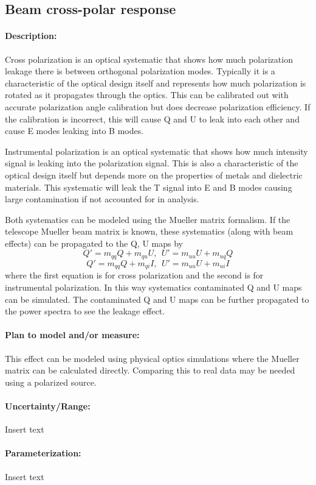 \subsection{Beam cross-polar response}

\paragraph{Description:}
Cross polarization is an optical systematic that shows how much polarization leakage there is between orthogonal polarization modes. Typically it is a characteristic of the optical design itself and represents how much polarization is rotated as it propagates through the optics. This can be calibrated out with accurate polarization angle calibration but does decrease polarization efficiency. If the calibration is incorrect, this will cause Q and U to leak into each other and cause E modes leaking into B modes. 

Instrumental polarization is an optical systematic that shows how much intensity signal is leaking into the polarization signal. This is also a characteristic of the optical design itself but depends more on the properties of metals and dielectric materials. This systematic will leak the T signal into E and B modes causing large contamination if not accounted for in analysis.

Both systematics can be modeled using the Mueller matrix formalism. If the telescope Mueller beam matrix is known, these systematics (along with beam effects) can be propagated to the Q, U maps by
\begin{equation}
Q' = m_{qq} Q + m_{qu} U, \ \ U' = m_{uu} U + m_{uq} Q
\end{equation}
\begin{equation}
Q' = m_{qq} Q + m_{qi} I, \ \ U' = m_{uu} U + m_{ui} I
\end{equation}
where the first equation is for cross polarization and the second is for instrumental polarization. In this way systematics contaminated Q and U maps can be simulated. The contaminated Q and U maps can be further propagated to the power spectra to see the leakage effect.

\paragraph{Plan to model and/or measure:}
This effect can be modeled using physical optics simulations where the Mueller matrix can be calculated directly. Comparing this to real data may be needed using a polarized source.

\paragraph{Uncertainty/Range:}
Insert text

\paragraph{Parameterization:}
Insert text